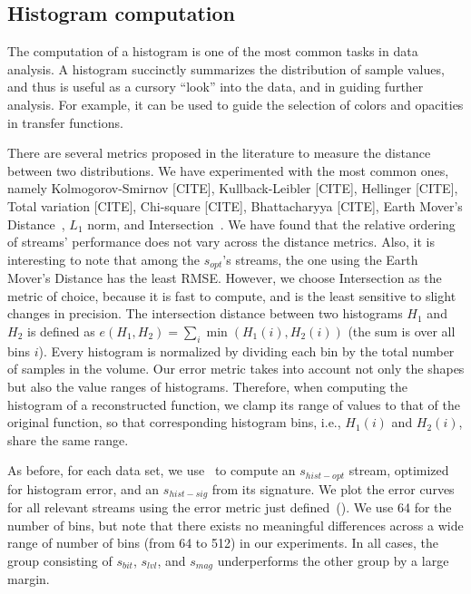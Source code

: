 \subsection{Histogram computation}\label{sec:histogram}

The computation of a histogram is one of the most common tasks in data analysis. A histogram
succinctly summarizes the distribution of sample values, and thus is useful as a cursory ``look''
into the data, and in guiding further analysis. For example, it can be used to guide the selection
of colors and opacities in transfer functions.

There are several metrics proposed in the literature to measure the distance between two
distributions. We have experimented with the most common ones, namely Kolmogorov-Smirnov [CITE],
Kullback-Leibler [CITE], Hellinger [CITE], Total variation [CITE], Chi-square [CITE], Bhattacharyya
[CITE], Earth Mover's Distance~\cite{emd1998}, $L_1$ norm, and
Intersection~\cite{histogram_intersection1991}. We have found that the relative ordering of streams'
performance does not vary across the distance metrics. Also, it is interesting to note that among
the $s_{opt}$'s streams, the one using the Earth Mover's Distance has the least RMSE. However, we choose Intersection as the
metric of choice, because it is fast to compute, and is the least sensitive to slight changes in
precision. The intersection distance between two histograms $H_1$ and $H_2$ is defined as
$e(H_1,H_2)=\sum_{i}{\min{(H_1(i),H_2(i))}}$ (the sum is over all bins $i$). Every histogram is
normalized by dividing each bin by the total number of samples in the volume. Our error metric takes
into account not only the shapes but also the value ranges of histograms. Therefore, when computing
the histogram of a reconstructed function, we clamp its range of values to that of the original
function, so that corresponding histogram bins, i.e., $H_1(i)$ and $H_2(i)$, share the same range.

As before, for each data set, we use~ to compute an $s_{hist-opt}$ stream,
optimized for histogram error, and an $s_{hist-sig}$ from its signature. We plot the error curves
for all relevant streams using the error metric just
defined~(). We use 64 for the number of bins, but note that
there exists no meaningful differences across a wide range of number of bins (from 64 to 512) in our
experiments. In all cases, the group consisting of $s_{bit}$, $s_{lvl}$, and $s_{mag}$ underperforms
the other group by a large margin.

